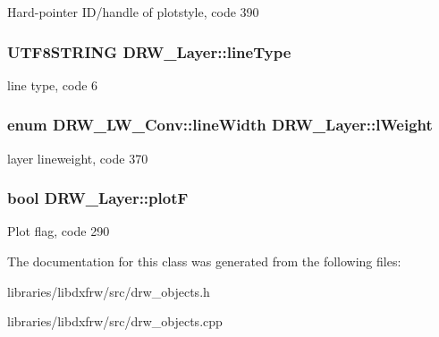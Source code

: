 Hard-\/pointer I\-D/handle of plotstyle, code 390 \hypertarget{classDRW__Layer_a269aec5f78373fe152d83c39eca08ed0}{
\subsubsection[{line\-Type}]{\setlength{\rightskip}{0pt plus 5cm}U\-T\-F8\-S\-T\-R\-I\-N\-G D\-R\-W\-\_\-\-Layer\-::line\-Type}}\label{classDRW__Layer_a269aec5f78373fe152d83c39eca08ed0}
line type, code 6 \hypertarget{classDRW__Layer_a55dca2dbf071c0350a8b2aa3d9c5bfbd}{
\subsubsection[{l\-Weight}]{\setlength{\rightskip}{0pt plus 5cm}enum {\bf D\-R\-W\-\_\-\-L\-W\-\_\-\-Conv\-::line\-Width} D\-R\-W\-\_\-\-Layer\-::l\-Weight}}\label{classDRW__Layer_a55dca2dbf071c0350a8b2aa3d9c5bfbd}
layer lineweight, code 370 \hypertarget{classDRW__Layer_ac385c41055cb96d3c0ccb2938cb198f9}{
\subsubsection[{plot\-F}]{\setlength{\rightskip}{0pt plus 5cm}bool D\-R\-W\-\_\-\-Layer\-::plot\-F}}\label{classDRW__Layer_ac385c41055cb96d3c0ccb2938cb198f9}
Plot flag, code 290 

The documentation for this class was generated from the following files\-:\begin{DoxyCompactItemize}
\item 
libraries/libdxfrw/src/drw\-\_\-objects.\-h\item 
libraries/libdxfrw/src/drw\-\_\-objects.\-cpp\end{DoxyCompactItemize}
